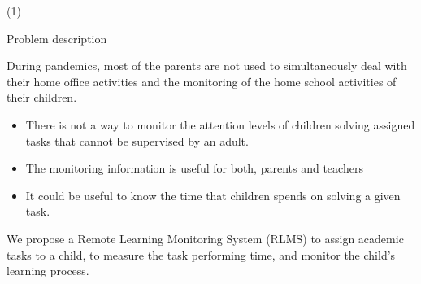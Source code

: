 



\begin{frame}{ \footnotemark (1)}
\begin{block}{Problem description} 

During pandemics, most of the parents are not used to simultaneously deal with their home office activities and the monitoring of the home school activities of their children. 


	\begin{itemize}
		\item There is not a way to monitor the attention levels of children solving assigned tasks that cannot be supervised by an adult.
		\item The monitoring information is useful for both, parents and teachers
		\item It could be useful to know the time that children spends on solving a given task.
	\end{itemize}

We propose a Remote Learning Monitoring System (RLMS) to assign academic tasks to a child, to measure the task performing time, and monitor the child's learning process.


\end{block} 
\setcounter{footnote}{0}

\end{frame}


